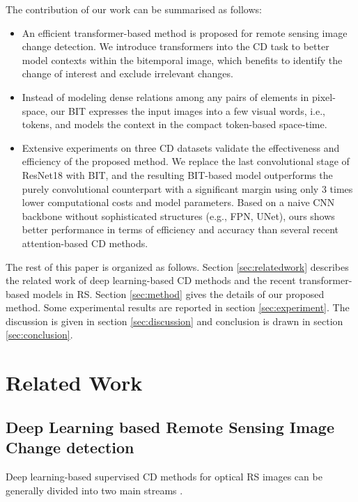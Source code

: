 \documentclass[journal]{IEEEtran}
\begin{document}
The contribution of our work can be summarised as follows:
\begin{itemize}
\item An efficient transformer-based method is proposed for remote sensing image change detection. We introduce transformers into the CD task to better model contexts within the bitemporal image, which benefits to identify the change of interest and exclude irrelevant changes.

\item Instead of modeling dense relations among any pairs of elements in pixel-space, our BIT expresses the input images into a few visual words, i.e., tokens, and models the context in the compact token-based space-time.

\item Extensive experiments on three CD datasets validate the effectiveness and efficiency of the proposed method. We replace the last convolutional stage of ResNet18 with BIT, and the resulting BIT-based model outperforms the purely convolutional counterpart with a significant margin using only 3 times lower computational costs and model parameters. Based on a naive CNN backbone without sophisticated structures (e.g., FPN, UNet), ours shows better performance in terms of efficiency and accuracy than several recent attention-based CD methods.
\end{itemize}

The rest of this paper is organized as follows. Section \ref{sec:relatedwork} describes the related work of deep learning-based CD methods and the recent transformer-based models in RS. Section \ref{sec:method} gives the details of our proposed method. Some experimental results are reported in section \ref{sec:experiment}. The discussion is given in section \ref{sec:discussion} and conclusion is drawn in section \ref{sec:conclusion}.


\section{Related Work} \label{relatedwork}
\label{sec:relatedwork}

\subsection{Deep Learning based Remote Sensing Image Change detection}

Deep learning-based supervised CD methods for optical RS images can be generally divided into two main streams \cite{Zhang2020a}. 
\end{document}
